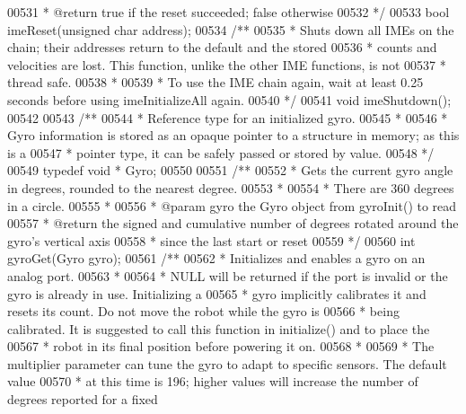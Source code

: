 \begin{DoxyCode}
00531 \textcolor{comment}{ * @return true if the reset succeeded; false otherwise}
00532 \textcolor{comment}{ */}
00533 \textcolor{keywordtype}{bool} imeReset(\textcolor{keywordtype}{unsigned} \textcolor{keywordtype}{char} address);
00534 \textcolor{comment}{/**}
00535 \textcolor{comment}{ * Shuts down all IMEs on the chain; their addresses return to the default and the stored}
00536 \textcolor{comment}{ * counts and velocities are lost. This function, unlike the other IME functions, is not}
00537 \textcolor{comment}{ * thread safe.}
00538 \textcolor{comment}{ *}
00539 \textcolor{comment}{ * To use the IME chain again, wait at least 0.25 seconds before using imeInitializeAll again.}
00540 \textcolor{comment}{ */}
00541 \textcolor{keywordtype}{void} imeShutdown();
00542 
00543 \textcolor{comment}{/**}
00544 \textcolor{comment}{ * Reference type for an initialized gyro.}
00545 \textcolor{comment}{ *}
00546 \textcolor{comment}{ * Gyro information is stored as an opaque pointer to a structure in memory; as this is a}
00547 \textcolor{comment}{ * pointer type, it can be safely passed or stored by value.}
00548 \textcolor{comment}{ */}
00549 \textcolor{keyword}{typedef} \textcolor{keywordtype}{void} * Gyro;
00550 
00551 \textcolor{comment}{/**}
00552 \textcolor{comment}{ * Gets the current gyro angle in degrees, rounded to the nearest degree.}
00553 \textcolor{comment}{ *}
00554 \textcolor{comment}{ * There are 360 degrees in a circle.}
00555 \textcolor{comment}{ *}
00556 \textcolor{comment}{ * @param gyro the Gyro object from gyroInit() to read}
00557 \textcolor{comment}{ * @return the signed and cumulative number of degrees rotated around the gyro's vertical axis}
00558 \textcolor{comment}{ * since the last start or reset}
00559 \textcolor{comment}{ */}
00560 \textcolor{keywordtype}{int} gyroGet(Gyro gyro);
00561 \textcolor{comment}{/**}
00562 \textcolor{comment}{ * Initializes and enables a gyro on an analog port.}
00563 \textcolor{comment}{ *}
00564 \textcolor{comment}{ * NULL will be returned if the port is invalid or the gyro is already in use. Initializing a}
00565 \textcolor{comment}{ * gyro implicitly calibrates it and resets its count. Do not move the robot while the gyro is}
00566 \textcolor{comment}{ * being calibrated. It is suggested to call this function in initialize() and to place the}
00567 \textcolor{comment}{ * robot in its final position before powering it on.}
00568 \textcolor{comment}{ *}
00569 \textcolor{comment}{ * The multiplier parameter can tune the gyro to adapt to specific sensors. The default value}
00570 \textcolor{comment}{ * at this time is 196; higher values will increase the number of degrees reported for a fixed}

\end{DoxyCode}
